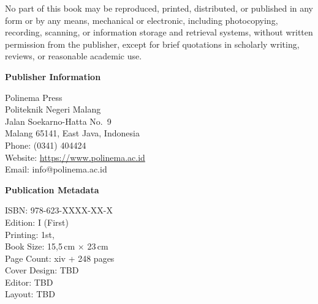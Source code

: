 \begin{titlepage}
\begin{tcolorbox}[
    enhanced,
    colback=white,
    colframe=black!45,
    boxrule=0.5pt,
    arc=1.5pt,
    left=8pt,
    right=8pt,
    top=8pt,
    bottom=8pt
]
\vspace{0.35cm}

No part of this book may be reproduced, printed, distributed, or published in any form or by any means, mechanical or electronic, including photocopying, recording, scanning, or information storage and retrieval systems, without written permission from the publisher, except for brief quotations in scholarly writing, reviews, or reasonable academic use.
\end{tcolorbox}

\vspace{0.45cm}

\begin{minipage}[t]{0.48\textwidth}
\begin{tcolorbox}[
    enhanced,
    colback=black!2,
    colframe=black!45,
    boxrule=0.5pt,
    arc=1.5pt,
    left=8pt,
    right=8pt,
    top=8pt,
    bottom=8pt,
    height=6.25cm
]
{\bfseries\sffamily Publisher Information}\par
\vspace{0.25cm}
Polinema Press\\
Politeknik Negeri Malang\\
Jalan Soekarno-Hatta No.~9\\
Malang 65141, East Java, Indonesia\\[0.2cm]
Phone: (0341) 404424\\
Website: \url{https://www.polinema.ac.id}\\
Email: info@polinema.ac.id
\end{tcolorbox}
\end{minipage}
\hfill
\begin{minipage}[t]{0.48\textwidth}
\begin{tcolorbox}[
    enhanced,
    colback=black!2,
    colframe=black!45,
    boxrule=0.5pt,
    arc=1.5pt,
    left=8pt,
    right=8pt,
    top=8pt,
    bottom=8pt,
    height=6.25cm
]
{\bfseries\sffamily Publication Metadata}\par
\vspace{0.25cm}
ISBN: 978-623-XXXX-XX-X\\
Edition: I (First)\\
Printing: 1st, \the\year\\
Book Size: 15{,}5\,cm $\times$ 23\,cm\\
Page Count: xiv + 248 pages\\
Cover Design: TBD\\
Editor: TBD\\
Layout: TBD
\end{tcolorbox}
\end{minipage}


\end{titlepage}
